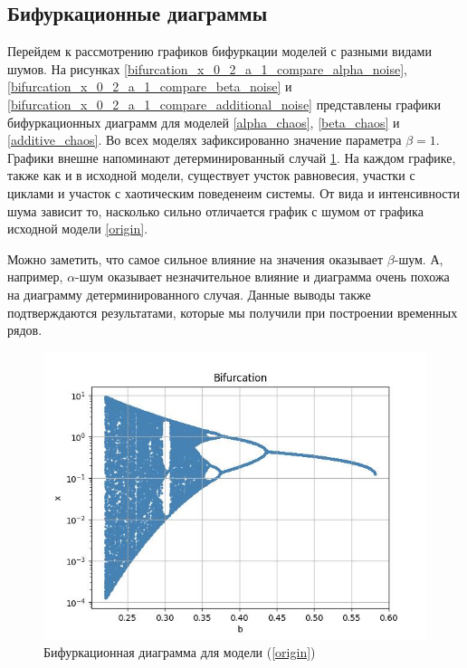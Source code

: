 \subsection{Бифуркационные диаграммы}

    Перейдем к рассмотрению графиков бифуркации моделей с разными видами шумов. На рисунках \ref{bifurcation_x_0_2_a_1_compare_alpha_noise}, \ref{bifurcation_x_0_2_a_1_compare_beta_noise} и \ref{bifurcation_x_0_2_a_1_compare_additional_noise} представлены графики бифуркационных диаграмм для моделей \ref{alpha_chaos}, \ref{beta_chaos} и \ref{additive_chaos}. Во всех моделях зафиксированно значение параметра \(\beta = 1\). Графики внешне напоминают детерминированный случай \ref{bifurcation_x_0_2_a_1_compare_no_noise}. На каждом графике, также как и в исходной модели, существует учсток равновесия, участки с циклами и участок с хаотическим поведенеим системы. От вида и интенсивности шума зависит то, насколько сильно отличается график с шумом от графика исходной модели \ref{origin}. 

    Можно заметить, что самое сильное влияние на значения оказывает \(\beta\)-шум. А, например, \(\alpha\)-шум оказывает незначительное влияние и диаграмма очень похожа на диаграмму детерминированного случая. Данные выводы также подтверждаются результатами, которые мы получили при построении временных рядов.

    \begin{figure}
        \centering
        \includegraphics[width=\textwidth]{stochastic/images/bifurcation_x_0_2_a_1_compare_no_noise.jpg}
        
        \captionsetup{justification=centering}
        \caption{Бифуркационная диаграмма для модели (\ref{origin})}
        \label{bifurcation_x_0_2_a_1_compare_no_noise}
    \end{figure}

